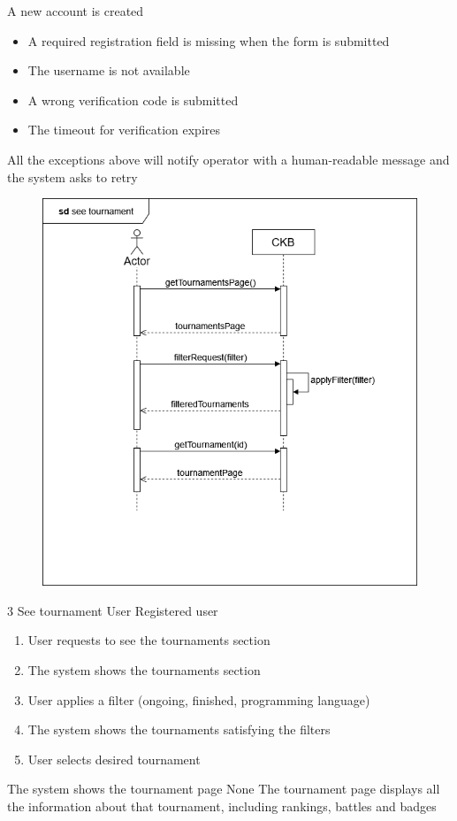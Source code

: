 {A new account is created} %
{ %
    \begin{itemize}
        \item A required registration field is missing when the form is submitted
        \item The username is not available
        \item A wrong verification code is submitted
        \item The timeout for verification expires
    \end{itemize}
}
{ %
    All the exceptions above will notify operator with a human-readable message and the system asks to retry
}

\usecase
{
    \begin{figure}[H]
        \centering
        \includegraphics[width=\textwidth]{src/sequence_diagrams/tournaments.png}
    \end{figure}
}
{3}
{See tournament} %
{User} %
{Registered user} %
{ %
    \begin{enumerate}
        \item User requests to see the tournaments section
        \item The system shows the tournaments section
        \item User applies a filter (ongoing, finished, programming language)    
        \item The system shows the tournaments satisfying the filters
        \item User selects desired tournament
    \end{enumerate}
}
{The system shows the tournament page} %
{ %
    None
}
{ %
The tournament page displays all the information about that tournament, including rankings, battles and badges
}

